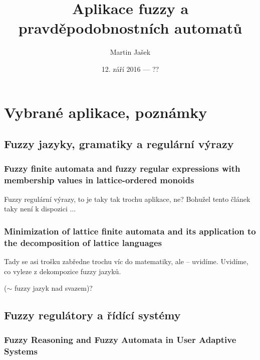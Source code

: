 \documentclass[a4paper,10pt]{article}
\title{Aplikace fuzzy a pravděpodobnostních automatů}
\author{Martin Jašek}
\date{12. září 2016 --- ??}
\begin{document}
\maketitle
\tableofcontents

\newpage

\section{Vybrané aplikace, poznámky}

\subsection{Fuzzy jazyky, gramatiky a regulární výrazy}


\subsubsection*{Fuzzy finite automata and fuzzy regular expressions with membership values in lattice-ordered monoids \cite{LiPed-FuzzFinAutFuzzRegExMembValLattOrdMon}}

Fuzzy regulární výrazy, to je taky tak trochu aplikace, ne? Bohužel tento článek taky není k dispozici ...


\subsubsection*{Minimization of lattice finite automata and its application to the decomposition of lattice languages \cite{LiPed-MinLattFinAutAppDecoLattLang}}

Tady se asi trošku zabředne trochu víc do matematiky, ale -- uvidíme. Uvidíme, co vyleze z dekompozice fuzzy jazyků.

\begin{definition}
  ($\sim$ fuzzy jazyk nad svazem)?
\end{definition}


\subsection{Fuzzy regulátory a řídící systémy}

\subsubsection*{Fuzzy Reasoning and Fuzzy Automata in User Adaptive Systems \cite{Kov-ReasFuzzAutInUsrAdpSyss}}
\end{document}
